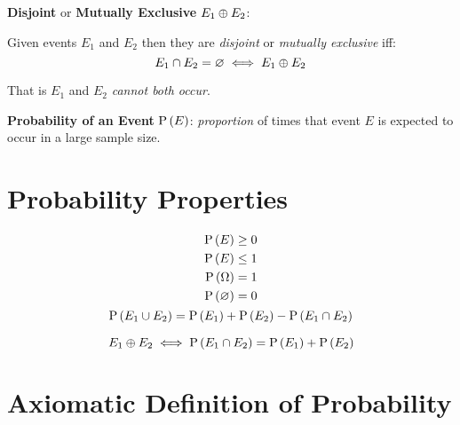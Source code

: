 \textbf{Disjoint} or \textbf{Mutually Exclusive} $E_1 \oplus E_2$:

Given events $E_1$ and $E_2$ then they are \textit{disjoint} or \textit{mutually exclusive} iff:
\begin{equation*}
    E_1 \cap E_2 = \varnothing \iff E_1 \oplus E_2
\end{equation*}

That is $E_1$ and $E_2$ \textit{cannot both occur}.

\textbf{Probability of an Event} $\mathrm{P} \left( E \right)$: \textit{proportion} of times that event $E$ is expected to occur in a large sample size.

\section*{Probability Properties}

\begin{gather*}
    \begin{aligned}
        \mathrm{P} \left( E \right) &\ge 0 \\
        \mathrm{P} \left( E \right) &\le 1 \\
        \mathrm{P} \left( \Omega \right) &= 1 \\
        \mathrm{P} \left( \varnothing \right) &= 0
    \end{aligned} \\
    \mathrm{P} \left( E_1 \cup E_2 \right) = \mathrm{P} \left( E_1 \right) + \mathrm{P} \left( E_2 \right) - \mathrm{P} \left( E_1 \cap E_2 \right)
\end{gather*}

\begin{equation*}
    E_1 \oplus E_2 \iff \mathrm{P} \left( E_1 \cap E_2 \right) = \mathrm{P} \left( E_1 \right) + \mathrm{P} \left( E_2 \right)
\end{equation*}

\section*{Axiomatic Definition of Probability}
